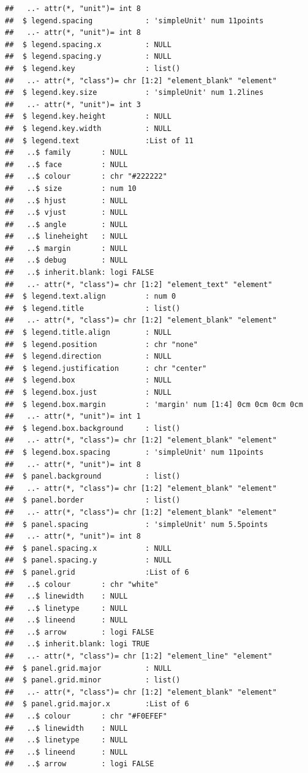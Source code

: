 \documentclass[12pt,preprint, authoryear]{elsarticle}
\numberwithin{equation}{section}
\numberwithin{figure}{section}
\numberwithin{table}{section}
\begin{document}
\begin{verbatim}
##   ..- attr(*, "unit")= int 8
##  $ legend.spacing            : 'simpleUnit' num 11points
##   ..- attr(*, "unit")= int 8
##  $ legend.spacing.x          : NULL
##  $ legend.spacing.y          : NULL
##  $ legend.key                : list()
##   ..- attr(*, "class")= chr [1:2] "element_blank" "element"
##  $ legend.key.size           : 'simpleUnit' num 1.2lines
##   ..- attr(*, "unit")= int 3
##  $ legend.key.height         : NULL
##  $ legend.key.width          : NULL
##  $ legend.text               :List of 11
##   ..$ family       : NULL
##   ..$ face         : NULL
##   ..$ colour       : chr "#222222"
##   ..$ size         : num 10
##   ..$ hjust        : NULL
##   ..$ vjust        : NULL
##   ..$ angle        : NULL
##   ..$ lineheight   : NULL
##   ..$ margin       : NULL
##   ..$ debug        : NULL
##   ..$ inherit.blank: logi FALSE
##   ..- attr(*, "class")= chr [1:2] "element_text" "element"
##  $ legend.text.align         : num 0
##  $ legend.title              : list()
##   ..- attr(*, "class")= chr [1:2] "element_blank" "element"
##  $ legend.title.align        : NULL
##  $ legend.position           : chr "none"
##  $ legend.direction          : NULL
##  $ legend.justification      : chr "center"
##  $ legend.box                : NULL
##  $ legend.box.just           : NULL
##  $ legend.box.margin         : 'margin' num [1:4] 0cm 0cm 0cm 0cm
##   ..- attr(*, "unit")= int 1
##  $ legend.box.background     : list()
##   ..- attr(*, "class")= chr [1:2] "element_blank" "element"
##  $ legend.box.spacing        : 'simpleUnit' num 11points
##   ..- attr(*, "unit")= int 8
##  $ panel.background          : list()
##   ..- attr(*, "class")= chr [1:2] "element_blank" "element"
##  $ panel.border              : list()
##   ..- attr(*, "class")= chr [1:2] "element_blank" "element"
##  $ panel.spacing             : 'simpleUnit' num 5.5points
##   ..- attr(*, "unit")= int 8
##  $ panel.spacing.x           : NULL
##  $ panel.spacing.y           : NULL
##  $ panel.grid                :List of 6
##   ..$ colour       : chr "white"
##   ..$ linewidth    : NULL
##   ..$ linetype     : NULL
##   ..$ lineend      : NULL
##   ..$ arrow        : logi FALSE
##   ..$ inherit.blank: logi TRUE
##   ..- attr(*, "class")= chr [1:2] "element_line" "element"
##  $ panel.grid.major          : NULL
##  $ panel.grid.minor          : list()
##   ..- attr(*, "class")= chr [1:2] "element_blank" "element"
##  $ panel.grid.major.x        :List of 6
##   ..$ colour       : chr "#F0EFEF"
##   ..$ linewidth    : NULL
##   ..$ linetype     : NULL
##   ..$ lineend      : NULL
##   ..$ arrow        : logi FALSE

\end{verbatim}
\end{document}
